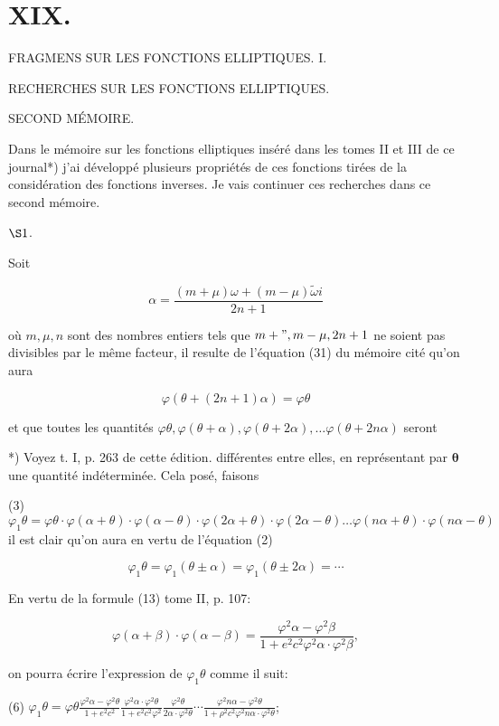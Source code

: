 \documentclass{article}
\begin{document}
\section*{XIX.}

FRAGMENS SUR LES FONCTIONS ELLIPTIQUES.
I.

RECHERCHES SUR LES FONCTIONS ELLIPTIQUES.

SECOND MÉMOIRE.

Dans le mémoire sur les fonctions elliptiques inséré dans les tomes II et III de ce journal*) j'ai développé plusieurs propriétés de ces fonctions tirées de la considération des fonctions inverses. Je vais continuer ces recherches dans ce second mémoire.

\(\S 1\).

Soit

\[
\alpha=\frac{(m+\mu) \omega+(m-\mu) \tilde{\omega} i}{2 n+1}
\]

où \(m, \mu, n\) sont des nombres entiers tels que \(m+", m-\mu, 2 n+1\) ne soient pas divisibles par le même facteur, il resulte de l'équation (31) du mémoire cité qu'on aura

\[
\varphi(\theta+(2 n+1) \alpha)=\varphi \theta
\]

et que toutes les quantités \(\varphi \theta, \varphi(\theta+\alpha), \varphi(\theta+2 \alpha), \ldots \varphi(\theta+2 n \alpha)\) seront

*) Voyez t. I, p. 263 de cette édition.
différentes entre elles, en représentant par \(\boldsymbol{\theta}\) une quantité indéterminée. Cela posé, faisons

(3) \(\varphi_{1} \theta=\varphi \theta \cdot \varphi(\alpha+\theta) \cdot \varphi(\alpha-\theta) \cdot \varphi(2 \alpha+\theta) \cdot \varphi(2 \alpha-\theta) \ldots \varphi(n \alpha+\theta) \cdot \varphi(n \alpha-\theta)\) il est clair qu'on aura en vertu de l'équation (2)

\[
\varphi_{1} \theta=\varphi_{1}(\theta \pm \alpha)=\varphi_{1}(\theta \pm 2 \alpha)=\cdots
\]

En vertu de la formule (13) tome II, p. 107:

\[
\varphi(\alpha+\beta) \cdot \varphi(\alpha-\beta)=\frac{\varphi^{2} \alpha-\varphi^{2} \beta}{1+e^{2} c^{2} \varphi^{2} \alpha \cdot \varphi^{2} \beta},
\]

on pourra écrire l'expression de \(\varphi_{1} \theta\) comme il suit:

(6) \(\varphi_{1} \theta=\varphi \theta \frac{\varphi^{2} \alpha-\varphi^{2} \theta}{1+e^{2} c^{2}} \frac{\varphi^{2} \alpha \cdot \varphi^{2} \theta}{1+e^{2} c^{2} \varphi^{2}} \frac{\varphi^{2} \theta}{2 \alpha \cdot \varphi^{2} \theta} \cdots \frac{\varphi^{2} n \alpha-\varphi^{2} \theta}{1+\rho^{2} c^{2} \varphi^{2} n \alpha \cdot \varphi^{2} \theta}\);
\end{document}
